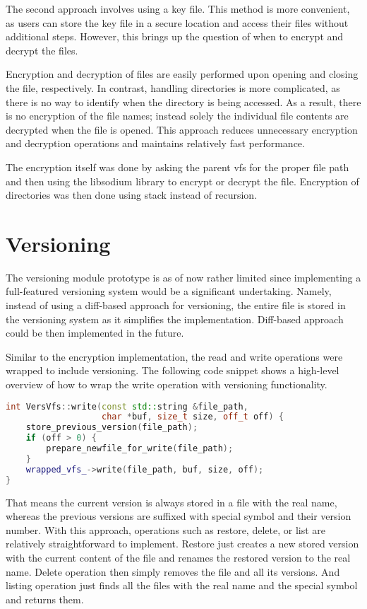 The second approach involves using a key file.
This method is more convenient, as users can store the key file in a secure location and access their files without additional steps.
However, this brings up the question of when to encrypt and decrypt the files.

Encryption and decryption of files are easily performed upon opening and closing the file, respectively.
In contrast, handling directories is more complicated, as there is no way to identify when the directory is being accessed.
As a result, there is no encryption of the file names; instead solely the individual file contents are decrypted when the file is opened.
This approach reduces unnecessary encryption and decryption operations and maintains relatively fast performance.

The encryption itself was done by asking the parent vfs for the proper file path and then using the libsodium library to encrypt or decrypt the file.
Encryption of directories was then done using stack instead of recursion.


\section{Versioning}\label{sec:versioning2}

The versioning module prototype is as of now rather limited since implementing a full-featured versioning system would be a significant undertaking.
Namely, instead of using a diff-based approach for versioning, the entire file is stored in the versioning system as it simplifies the implementation.
Diff-based approach could be then implemented in the future.

Similar to the encryption implementation, the read and write operations were wrapped to include versioning.
The following code snippet shows a high-level overview of how to wrap the write operation with versioning functionality.

\begin{lstlisting}[language=c++, caption={Write with versioning functionality}, basicstyle=\ttfamily\small]
int VersVfs::write(const std::string &file_path,
                   char *buf, size_t size, off_t off) {
    store_previous_version(file_path);
    if (off > 0) {
        prepare_newfile_for_write(file_path);
    }
    wrapped_vfs_->write(file_path, buf, size, off);
}
\end{lstlisting}

That means the current version is always stored in a file with the real name, whereas the previous versions are suffixed with special symbol and their version number.
With this approach, operations such as restore, delete, or list are relatively straightforward to implement.
Restore just creates a new stored version with the current content of the file and renames the restored version to the real name.
Delete operation then simply removes the file and all its versions.
And listing operation just finds all the files with the real name and the special symbol and returns them.